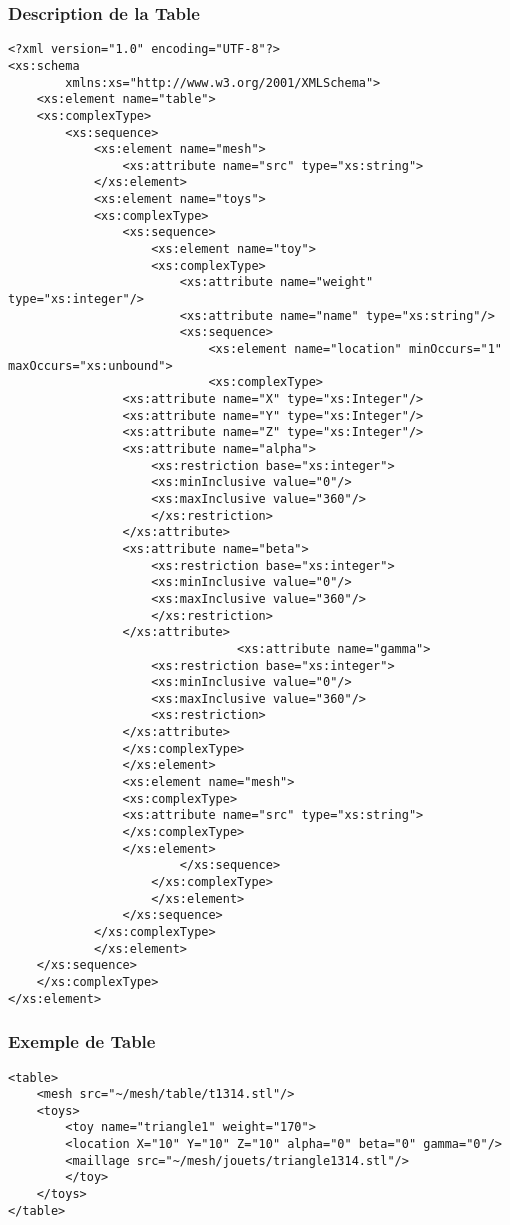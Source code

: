 \subsubsection{Description de la Table}
 \begin{lstlisting}[caption=Description de la Table, label=desctable]
<?xml version="1.0" encoding="UTF-8"?>
<xs:schema
        xmlns:xs="http://www.w3.org/2001/XMLSchema">
    <xs:element name="table">
    <xs:complexType>
        <xs:sequence>
            <xs:element name="mesh">
                <xs:attribute name="src" type="xs:string">
            </xs:element>
            <xs:element name="toys">
            <xs:complexType>
                <xs:sequence>
                    <xs:element name="toy">
                    <xs:complexType>
                        <xs:attribute name="weight" type="xs:integer"/>
                        <xs:attribute name="name" type="xs:string"/>
                        <xs:sequence>
                            <xs:element name="location" minOccurs="1" maxOccurs="xs:unbound">
                            <xs:complexType>
				<xs:attribute name="X" type="xs:Integer"/>
				<xs:attribute name="Y" type="xs:Integer"/>
				<xs:attribute name="Z" type="xs:Integer"/>
				<xs:attribute name="alpha">
				    <xs:restriction base="xs:integer">
					<xs:minInclusive value="0"/>
					<xs:maxInclusive value="360"/>
				    </xs:restriction> 
				</xs:attribute>
				<xs:attribute name="beta">
				    <xs:restriction base="xs:integer">
					<xs:minInclusive value="0"/>
					<xs:maxInclusive value="360"/>
				    </xs:restriction>
				</xs:attribute>
                                <xs:attribute name="gamma">
				    <xs:restriction base="xs:integer">
					<xs:minInclusive value="0"/>
					<xs:maxInclusive value="360"/>
				    <xs:restriction>
				</xs:attribute>
			    </xs:complexType>
			    </xs:element>
			    <xs:element name="mesh">
			    <xs:complexType>
				<xs:attribute name="src" type="xs:string">
			    </xs:complexType>
			    </xs:element>
                        </xs:sequence>
                    </xs:complexType>
                    </xs:element>
                </xs:sequence>
            </xs:complexType>
            </xs:element>
	</xs:sequence>
    </xs:complexType>
</xs:element>
\end{lstlisting}
  
\subsubsection{Exemple de Table}
\begin{lstlisting}[caption=Exemple de table, label=desctable]
<table>
    <mesh src="~/mesh/table/t1314.stl"/>
	<toys>
	    <toy name="triangle1" weight="170">
		<location X="10" Y="10" Z="10" alpha="0" beta="0" gamma="0"/>
		<maillage src="~/mesh/jouets/triangle1314.stl"/>
	    </toy>
	</toys>
</table>
\end{lstlisting}
